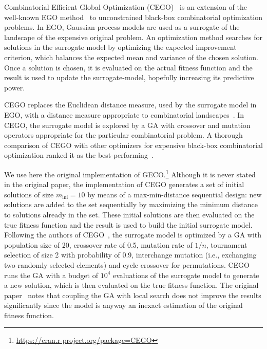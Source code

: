 \documentclass[sigconf,dvipsnames]{acmart}
\newcommand{\minit}{\ensuremath{m_\text{ini}}\xspace}
\begin{document}
%
Combinatorial Efficient Global Optimization (CEGO)~\citep{ZaeStoFriFisNauBar2014} is an extension of the well-known EGO
method~\citep{JonSchWel98go} to unconstrained black-box combinatorial
optimization problems. In EGO, Gaussian process models are used as a surrogate
of the landscape of the expensive original problem. An optimization method
searches for solutions in the surrogate model by optimizing the expected
improvement criterion, which balances the expected mean and variance of the
chosen solution. Once a solution is chosen, it is evaluated on the actual
fitness function and the result is used to update the surrogate-model,
hopefully increasing its predictive power.

CEGO replaces the Euclidean distance measure, used by the surrogate model in
EGO, with a distance measure appropriate to combinatorial
landscapes~\citep{ZaeStoBar2014:ppsn}.
%
In CEGO, the surrogate model is
explored by a GA with crossover and mutation operators appropriate for the
particular combinatorial problem. A thorough comparison of CEGO
with other optimizers for expensive black-box combinatorial optimization ranked
it as the best-performing~\citep{ZaeStoFriFisNauBar2014}.

We use here the original implementation of
GECO.\footnote{\url{https://cran.r-project.org/package=CEGO}} %
Although it is never stated in the original paper, the implementation of CEGO
generates a set of initial solutions of size $\minit=10$ by means of a
max-min-distance sequential design: new solutions are added to the set
sequentially by maximizing the minimum distance to solutions already in the
set. These initial solutions are then evaluated on the true fitness function
and the result is used to build the initial surrogate
model. %
Following the authors of
CEGO~\citep{ZaeStoFriFisNauBar2014,ZaeStoBar2014:ppsn}, the surrogate model is
optimized by a GA with population size of 20, crossover rate of 0.5, mutation
rate of $1/n$, tournament selection of size 2 with probability of 0.9,
interchange mutation (i.e., exchanging two randomly selected elements) and
cycle crossover for permutations. CEGO runs the GA with a budget of $10^4$
evaluations of the surrogate model to generate a new solution, which is then
evaluated on the true fitness function.  The original
paper~\citep[p.~875]{ZaeStoFriFisNauBar2014} notes that coupling the GA with
local search does not improve the results significantly since the model is
anyway an inexact estimation of the original fitness function.
\end{document}
